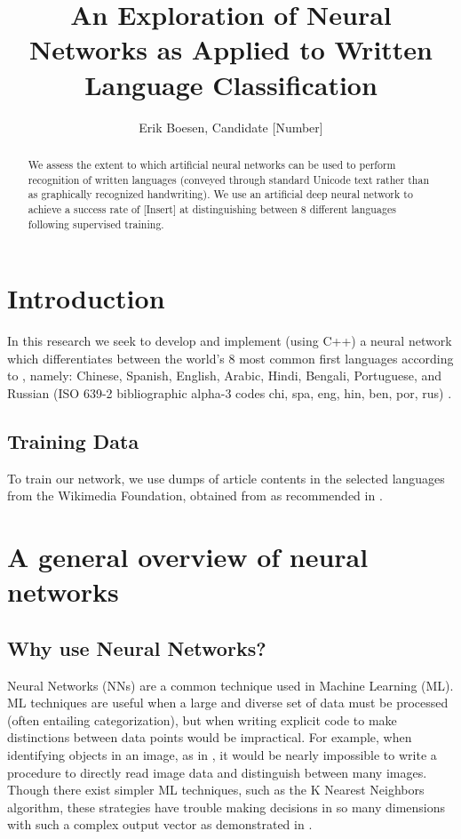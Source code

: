 \documentclass{article}
\begin{document}
\title{An Exploration of Neural Networks as Applied to Written Language Classification}
\author{Erik Boesen, Candidate [Number]}

\maketitle

\begin{abstract}
We assess the extent to which artificial neural networks can be used to perform recognition of written languages (conveyed through standard Unicode text rather than as graphically recognized handwriting). We use an artificial deep neural network to achieve a success rate of [Insert] at distinguishing between 8 different languages following supervised training.
\end{abstract}

\section{Introduction}
In this research we seek to develop and implement (using C++) a neural network which differentiates between the world's 8 most common first languages according to \cite{ethnologue}, namely: Chinese, Spanish, English, Arabic, Hindi, Bengali, Portuguese, and Russian (ISO 639-2 bibliographic alpha-3 codes chi, spa, eng, hin, ben, por, rus) \cite{iso639}.

\subsection{Training Data}
To train our network, we use dumps of article contents in the selected languages from the Wikimedia Foundation, obtained from \cite{wikidumps} as recommended in \cite{langsamp}. %

\section{A general overview of neural networks}
\subsection{Why use Neural Networks?}
Neural Networks (NNs) are a common technique used in Machine Learning (ML). ML techniques are useful when a large and diverse set of data must be processed (often entailing categorization), but when writing explicit code to make distinctions between data points would be impractical. For example, when identifying objects in an image, as in \cite{hinton12}, it would be nearly impossible to write a procedure to directly read image data and distinguish between many images. Though there exist simpler ML techniques, such as the K Nearest Neighbors algorithm, these strategies have trouble making decisions in so many dimensions with such a complex output vector as demonstrated in \cite{knnic}.
\end{document}
